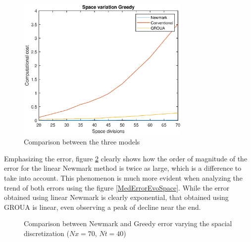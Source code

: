 \documentclass{ws-m3as}
\begin{document}
\begin{figure}
\centering
\includegraphics[width=0.75\textwidth]{CompCost3Space.eps}
\caption{Comparison between the three models} 
\label{CompCost3Space}
\end{figure}


Emphasizing the error, figure \ref{CompPropSpace} clearly shows how the order of magnitude of the error for the linear Newmark method is twice as large, which is a difference to take into account. This phenomenon is much more evident when analyzing the trend of both errors using the figure \ref{MedErrorEvoSpace}. While the error obtained using linear Newmark is clearly exponential, that obtained using GROUA is linear, even observing a peak of decline near the end.





\begin{figure}
 \centering
  \caption{Comparison between Newmark and Greedy error varying the spacial discretization ($Nx=70$, $Nt=40$)}
 \label{CompPropSpace}
\end{figure}
\end{document}

